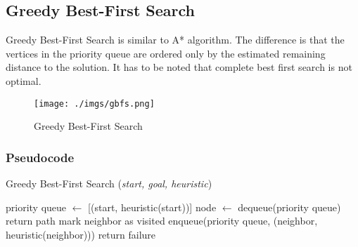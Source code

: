 \subsection{Greedy Best-First Search}
\noindent Greedy Best-First Search is similar to A* algorithm. The difference is that the vertices in the priority queue are ordered only by the estimated remaining distance to the solution. It has to be noted that complete best first search is not optimal.

\begin{figure}[H]
	\centering
	\texttt{[image: ./imgs/gbfs.png]}
	\caption{Greedy Best-First Search}
	\label{fig:GBFS}
\end{figure}

\subsubsection{Pseudocode}
\begin{algorithm}[H]
	\caption{Greedy Best-First Search (\textit{start, goal, heuristic})}
	\label{alg:gbfs}
	\begin{algorithmic}[1]
		\State priority queue \(\gets\) [(start, heuristic(start))]
		\State node \(\gets\) dequeue(priority queue)
		\State return path
		\EndIf
		\State mark neighbor as visited
		\State enqueue(priority queue, (neighbor, heuristic(neighbor)))
		\EndIf
		\EndFor
		\EndWhile
		\State return failure
	\end{algorithmic}
\end{algorithm}

